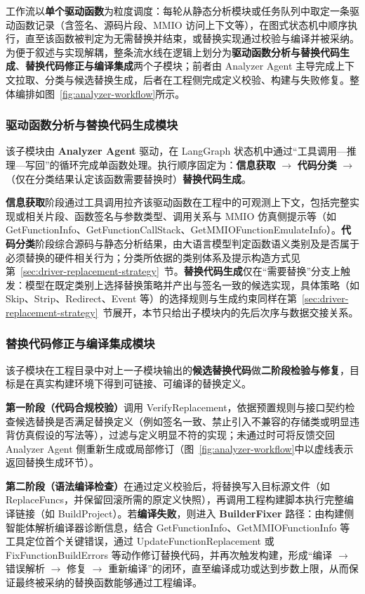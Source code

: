 工作流以\textbf{单个驱动函数}为粒度调度：每轮从静态分析模块或任务队列中取定一条驱动函数记录（含签名、源码片段、MMIO 访问上下文等），在图式状态机中顺序执行，直至该函数被判定为无需替换并结束，或替换实现通过校验与编译并被采纳。为便于叙述与实现解耦，整条流水线在逻辑上划分为\textbf{驱动函数分析与替换代码生成}、\textbf{替换代码修正与编译集成}两个子模块；前者由 Analyzer Agent 主导完成上下文拉取、分类与候选替换生成，后者在工程侧完成定义校验、构建与失败修复。整体编排如图~\ref{fig:analyzer-workflow}所示。

\subsubsection{驱动函数分析与替换代码生成模块}

该子模块由 \textbf{Analyzer Agent} 驱动，在 LangGraph 状态机中通过``工具调用—推理—写回''的循环完成单函数处理。执行顺序固定为：\textbf{信息获取} $\rightarrow$ \textbf{代码分类} $\rightarrow$（仅在分类结果认定该函数需要替换时）\textbf{替换代码生成}。

\textbf{信息获取}阶段通过工具调用拉齐该驱动函数在工程中的可观测上下文，包括完整实现或相关片段、函数签名与参数类型、调用关系与 MMIO 仿真侧提示等（如 GetFunctionInfo、GetFunctionCallStack、GetMMIOFunctionEmulateInfo）。\textbf{代码分类}阶段综合源码与静态分析结果，由大语言模型判定函数语义类别及是否属于必须替换的硬件相关行为；分类所依据的类别体系及提示构造方式见第~\ref{sec:driver-replacement-strategy}~节。\textbf{替换代码生成}仅在``需要替换''分支上触发：模型在既定类别上选择替换策略并产出与签名一致的候选实现，具体策略（如 Skip、Strip、Redirect、Event 等）的选择规则与生成约束同样在第~\ref{sec:driver-replacement-strategy}~节展开，本节只给出子模块内的先后次序与数据交接关系。

\subsubsection{替换代码修正与编译集成模块}

该子模块在工程目录中对上一子模块输出的\textbf{候选替换代码}做\textbf{二阶段检验与修复}，目标是在真实构建环境下得到可链接、可编译的替换定义。

\textbf{第一阶段（代码合规校验）}调用 VerifyReplacement，依据预置规则与接口契约检查候选替换是否满足替换定义（例如签名一致、禁止引入不兼容的存储类或明显违背仿真假设的写法等），过滤与定义明显不符的实现；未通过时可将反馈交回 Analyzer Agent 侧重新生成或局部修订（图~\ref{fig:analyzer-workflow}中以虚线表示返回替换生成环节）。

\textbf{第二阶段（语法编译检查）}在通过定义校验后，将替换写入目标源文件（如 ReplaceFuncs，并保留回滚所需的原定义快照），再调用工程构建脚本执行完整编译链接（如 BuildProject）。若\textbf{编译失败}，则进入 \textbf{BuilderFixer} 路径：由构建侧智能体解析编译器诊断信息，结合 GetFunctionInfo、GetMMIOFunctionInfo 等工具定位首个关键错误，通过 UpdateFunctionReplacement 或 FixFunctionBuildErrors 等动作修订替换代码，并再次触发构建，形成``编译 $\rightarrow$ 错误解析 $\rightarrow$ 修复 $\rightarrow$ 重新编译''的闭环，直至编译成功或达到步数上限，从而保证最终被采纳的替换函数能够通过工程编译。

